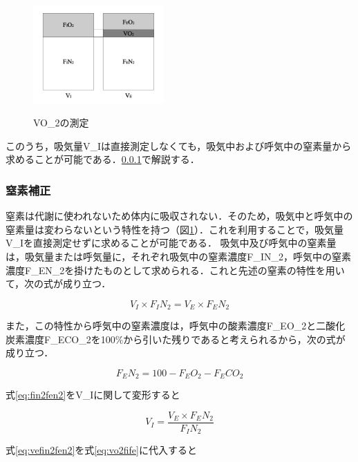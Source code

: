 \begin{figure}[h]
  \begin{center}
    \label{fig:vo2_measurement_mechanism}
    \includegraphics[width=5cm]{fig/vo2_measurement_mechanism.pdf}
    \caption{VO_2の測定}
  \end{center}
\end{figure}

このうち，吸気量V_Iは直接測定しなくても，吸気中および呼気中の窒素量から求めることが可能である．\ref{sec:n2correction}で解説する．

\subsubsection{窒素補正}
\label{sec:n2correction}

窒素は代謝に使われないため体内に吸収されない．そのため，吸気中と呼気中の窒素量は変わらないという特性を持つ（図\ref{fig:vo2_measurement_mechanism}）．これを利用することで，吸気量V_Iを直接測定せずに求めることが可能である．
吸気中及び呼気中の窒素量は，吸気量または呼気量に，それぞれ吸気中の窒素濃度F_IN_2，呼気中の窒素濃度F_EN_2を掛けたものとして求められる．これと先述の窒素の特性を用いて，次の式が成り立つ．

\begin{equation}
  \label{eq:fin2fen2}
  V_I \times F_IN_2 = V_E \times F_EN_2
\end{equation}

また，この特性から呼気中の窒素濃度は，呼気中の酸素濃度F_EO_2と二酸化炭素濃度F_ECO_2を100\%から引いた残りであると考えられるから，次の式が成り立つ．

\begin{equation}
  F_EN_2 = 100 - F_EO_2 - F_ECO_2
\end{equation}

式\ref{eq:fin2fen2}をV_Iに関して変形すると

\begin{equation}
  \label{eq:vefin2fen2}
  V_I = \frac{V_E \times F_EN_2}{F_IN_2}
\end{equation}

式\ref{eq:vefin2fen2}を式\ref{eq:vo2fife}に代入すると

